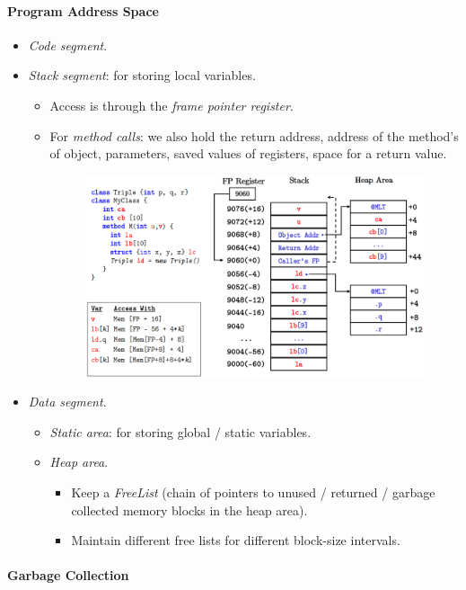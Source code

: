 \documentclass[twocolumn,english]{article}
\begin{document}
\paragraph{Program Address Space}
\begin{itemize}
\item \emph{Code segment}.
\item \emph{Stack segment}: for storing local variables.
\begin{itemize}
\item Access is through the \emph{frame pointer register}.
\item For \emph{method calls}: we also hold the return address, address
of the method's of object, parameters, saved values of registers,
space for a return value.
\begin{figure}[H]
\centering{}\includegraphics[width=0.75\linewidth]{img/stack}
\end{figure}
\end{itemize}
\item \emph{Data segment}.
\begin{itemize}
\item \emph{Static area}: for storing global / static variables.
\item \emph{Heap area}.
\begin{itemize}
\item Keep a \emph{FreeList} (chain of pointers to unused / returned / garbage
collected memory blocks in the heap area).
\item Maintain different free lists for different block-size intervals.
\end{itemize}
\end{itemize}
\end{itemize}

\paragraph{Garbage Collection}
\end{document}
